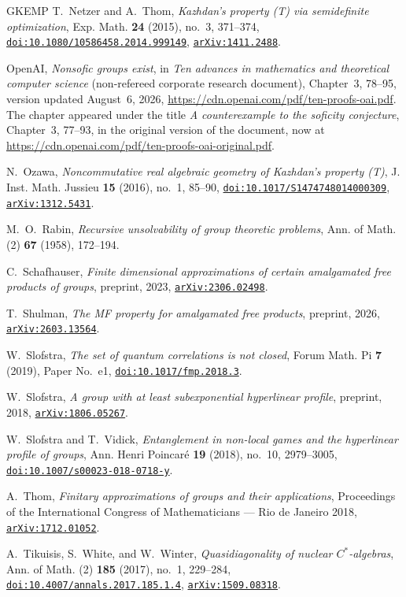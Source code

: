 \documentclass[11pt]{amsart}
\newcommand{\doi}[1]{\href{https://doi.org/#1}{\nolinkurl{doi:#1}}}
\newcommand{\arxiv}[1]{\href{https://arxiv.org/abs/#1}{\nolinkurl{arXiv:#1}}}
\theoremstyle{definition}
\theoremstyle{remark}
\theoremstyle{plain}
\begin{document}
\begin{thebibliography}{GKEMP}
T.~Netzer and A.~Thom,
\emph{Kazhdan's property (T) via semidefinite optimization},
Exp. Math. \textbf{24} (2015), no.~3, 371--374,
\doi{10.1080/10586458.2014.999149}, \arxiv{1411.2488}.

OpenAI,
\emph{Nonsofic groups exist},
in \emph{Ten advances in mathematics and theoretical computer science}
(non-refereed corporate research document),
Chapter~3, 78--95, version updated August~6, 2026,
\url{https://cdn.openai.com/pdf/ten-proofs-oai.pdf}.
The chapter appeared under the title \emph{A counterexample to the
soficity conjecture}, Chapter~3, 77--93, in the original version of the
document, now at
\url{https://cdn.openai.com/pdf/ten-proofs-oai-original.pdf}.

N.~Ozawa,
\emph{Noncommutative real algebraic geometry of Kazhdan's property (T)},
J. Inst. Math. Jussieu \textbf{15} (2016), no.~1, 85--90,
\doi{10.1017/S1474748014000309}, \arxiv{1312.5431}.

M.~O.~Rabin,
\emph{Recursive unsolvability of group theoretic problems},
Ann. of Math. (2) \textbf{67} (1958), 172--194.

C.~Schafhauser,
\emph{Finite dimensional approximations of certain amalgamated free
products of groups},
preprint, 2023, \arxiv{2306.02498}.

T.~Shulman,
\emph{The MF property for amalgamated free products},
preprint, 2026, \arxiv{2603.13564}.

W.~Slofstra,
\emph{The set of quantum correlations is not closed},
Forum Math. Pi \textbf{7} (2019), Paper No.~e1,
\doi{10.1017/fmp.2018.3}.

W.~Slofstra,
\emph{A group with at least subexponential hyperlinear profile},
preprint, 2018, \arxiv{1806.05267}.

W.~Slofstra and T.~Vidick,
\emph{Entanglement in non-local games and the hyperlinear profile of groups},
Ann. Henri Poincar\'e \textbf{19} (2018), no.~10, 2979--3005,
\doi{10.1007/s00023-018-0718-y}.

A.~Thom,
\emph{Finitary approximations of groups and their applications},
Proceedings of the International Congress of Mathematicians --- Rio de
Janeiro 2018, \arxiv{1712.01052}.

A.~Tikuisis, S.~White, and W.~Winter,
\emph{Quasidiagonality of nuclear $C^*$-algebras},
Ann. of Math. (2) \textbf{185} (2017), no.~1, 229--284,
\doi{10.4007/annals.2017.185.1.4}, \arxiv{1509.08318}.

\end{thebibliography}

\end{document}
